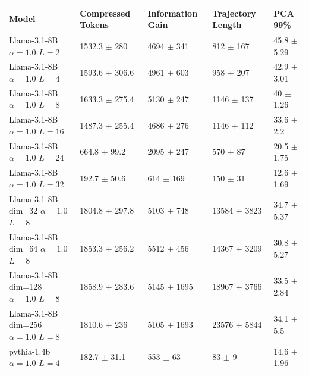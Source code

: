 \begin{tabular}{lllll}
\toprule
 Model                                                               & Compressed Tokens           & Information Gain         & Trajectory Length         & PCA 99\%                  \\
\midrule
 Llama-3.1-8B {\small $\alpha=1.0$} {\small $L=2$}                   & 1532.3 {\small $\pm$ 280}   & 4694 {\small $\pm$ 341}  & 812 {\small $\pm$ 167}    & 45.8 {\small $\pm$ 5.29} \\
 Llama-3.1-8B {\small $\alpha=1.0$} {\small $L=4$}                   & 1593.6 {\small $\pm$ 306.6} & 4961 {\small $\pm$ 603}  & 958 {\small $\pm$ 207}    & 42.9 {\small $\pm$ 3.01} \\
 Llama-3.1-8B {\small $\alpha=1.0$} {\small $L=8$}                   & 1633.3 {\small $\pm$ 275.4} & 5130 {\small $\pm$ 247}  & 1146 {\small $\pm$ 137}   & 40 {\small $\pm$ 1.26}   \\
 Llama-3.1-8B {\small $\alpha=1.0$} {\small $L=16$}                  & 1487.3 {\small $\pm$ 255.4} & 4686 {\small $\pm$ 276}  & 1146 {\small $\pm$ 112}   & 33.6 {\small $\pm$ 2.2}  \\
 Llama-3.1-8B {\small $\alpha=1.0$} {\small $L=24$}                  & 664.8 {\small $\pm$ 99.2}   & 2095 {\small $\pm$ 247}  & 570 {\small $\pm$ 87}     & 20.5 {\small $\pm$ 1.75} \\
 Llama-3.1-8B {\small $\alpha=1.0$} {\small $L=32$}                  & 192.7 {\small $\pm$ 50.6}   & 614 {\small $\pm$ 169}   & 150 {\small $\pm$ 31}     & 12.6 {\small $\pm$ 1.69} \\
 Llama-3.1-8B {\small dim=32} {\small $\alpha=1.0$} {\small $L=8$}   & 1804.8 {\small $\pm$ 297.8} & 5103 {\small $\pm$ 748}  & 13584 {\small $\pm$ 3823} & 34.7 {\small $\pm$ 5.37} \\
 Llama-3.1-8B {\small dim=64} {\small $\alpha=1.0$} {\small $L=8$}   & 1853.3 {\small $\pm$ 256.2} & 5512 {\small $\pm$ 456}  & 14367 {\small $\pm$ 3209} & 30.8 {\small $\pm$ 5.27} \\
 Llama-3.1-8B {\small dim=128} {\small $\alpha=1.0$} {\small $L=8$}  & 1858.9 {\small $\pm$ 283.6} & 5145 {\small $\pm$ 1695} & 18967 {\small $\pm$ 3766} & 33.5 {\small $\pm$ 2.84} \\
 Llama-3.1-8B {\small dim=256} {\small $\alpha=1.0$} {\small $L=8$}  & 1810.6 {\small $\pm$ 236}   & 5105 {\small $\pm$ 1693} & 23576 {\small $\pm$ 5844} & 34.1 {\small $\pm$ 5.5}  \\
 \midrule
 pythia-1.4b {\small $\alpha=1.0$} {\small $L=4$}                    & 182.7 {\small $\pm$ 31.1}   & 553 {\small $\pm$ 63}    & 83 {\small $\pm$ 9}       & 14.6 {\small $\pm$ 1.96} \\

\end{tabular}
